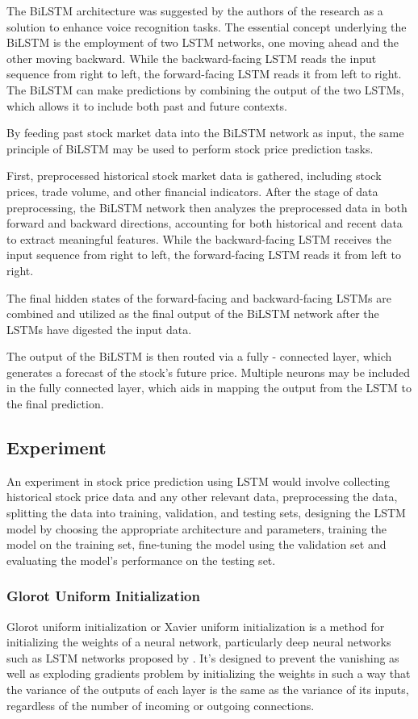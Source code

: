 \documentclass[a4paper]{article}
\begin{document}
The BiLSTM architecture was suggested by the authors of the research as a solution to enhance voice recognition tasks. The essential concept underlying the BiLSTM is the employment of two LSTM networks, one moving ahead and the other moving backward. While the backward-facing LSTM reads the input sequence from right to left, the forward-facing LSTM reads it from left to right. The BiLSTM can make predictions by combining the output of the two LSTMs, which allows it to include both past and future contexts.

By feeding past stock market data into the BiLSTM network as input, the same principle of BiLSTM may be used to perform stock price prediction tasks.

First, preprocessed historical stock market data is gathered, including stock prices, trade volume, and other financial indicators. After the stage of data preprocessing, the BiLSTM network then analyzes the preprocessed data in both forward and backward directions, accounting for both historical and recent data to extract meaningful features. While the backward-facing LSTM receives the input sequence from right to left, the forward-facing LSTM reads it from left to right.

The final hidden states of the forward-facing and backward-facing LSTMs are combined and utilized as the final output of the BiLSTM network after the LSTMs have digested the input data.

The output of the BiLSTM is then routed via a fully - connected layer, which generates a forecast of the stock's future price. Multiple neurons may be included in the fully connected layer, which aids in mapping the output from the LSTM to the final prediction.
\subsection{Experiment}
An experiment in stock price prediction using LSTM would involve collecting historical stock price data and any other relevant data, preprocessing the data, splitting the data into training, validation, and testing sets, designing the LSTM model by choosing the appropriate architecture and parameters, training the model on the training set, fine-tuning the model using the validation set and evaluating the model’s performance on the testing set.
\subsubsection{Glorot Uniform Initialization}
Glorot uniform initialization or Xavier uniform initialization is a method for initializing the weights of a neural network, particularly deep neural networks such as LSTM networks proposed by \cite{glorot2010understanding} . It's designed to prevent the vanishing as well as exploding gradients problem by initializing the weights in such a way that the variance of the outputs of each layer is the same as the variance of its inputs, regardless of the number of incoming or outgoing connections.
\end{document}
